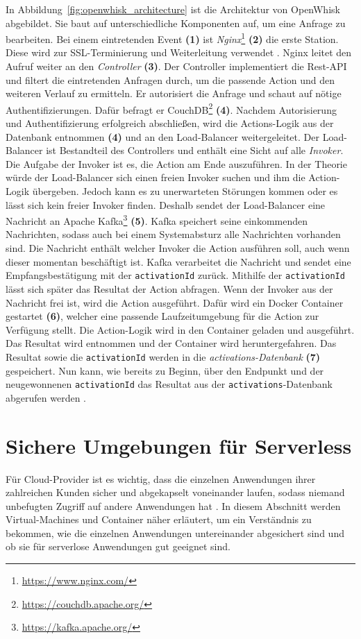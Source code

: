 In Abbildung~\ref{fig:openwhisk_architecture} ist die Architektur von
OpenWhisk abgebildet.
Sie baut auf unterschiedliche Komponenten auf,
um eine Anfrage zu bearbeiten. Bei einem eintretenden Event \textbf{(1)}
ist \emph{Nginx}\footnote{\url{https://www.nginx.com/}} \textbf{(2)} die erste
Station. Diese wird zur SSL-Terminierung und Weiterleitung verwendet \cite{OpenWhiskGithub}.
Nginx leitet den Aufruf weiter an den \emph{Controller} \textbf{(3)}.
Der Controller implementiert die Rest-API und filtert die
eintretenden Anfragen durch, um die passende Action und
den weiteren Verlauf zu ermitteln.
Er autorisiert die Anfrage und schaut auf nötige Authentifizierungen.
Dafür befragt er CouchDB\footnote{\url{https://couchdb.apache.org/}}
\textbf{(4)}. Nachdem Autorisierung
und Authentifizierung erfolgreich abschließen,
wird die Actions-Logik aus der Datenbank entnommen \textbf{(4)} und an den
Load-Balancer weitergeleitet. Der Load-Balancer ist Bestandteil
des Controllers und enthält eine Sicht auf alle \emph{Invoker}.
Die Aufgabe der Invoker ist es, die Action am Ende auszuführen.
In der Theorie würde der Load-Balancer sich einen freien Invoker suchen
und ihm die Action-Logik übergeben. Jedoch kann es zu unerwarteten
Störungen kommen oder es lässt sich kein freier
Invoker finden. Deshalb sendet der Load-Balancer eine Nachricht an
Apache Kafka\footnote{\url{https://kafka.apache.org/}} \textbf{(5)}.
Kafka speichert seine einkommenden Nachrichten, sodass auch bei einem Systemabsturz alle
Nachrichten vorhanden sind. Die Nachricht enthält welcher
Invoker die Action ausführen soll, auch wenn dieser momentan
beschäftigt ist. Kafka verarbeitet die Nachricht und sendet eine
Empfangsbestätigung mit der \texttt{activationId} zurück. Mithilfe
der \texttt{activationId} lässt sich später das Resultat der Action
abfragen. Wenn der Invoker aus der Nachricht frei ist, wird die
Action ausgeführt. Dafür wird ein Docker Container gestartet \textbf{(6)},
welcher eine passende Laufzeitumgebung für die Action zur Verfügung
stellt. Die Action-Logik wird in den Container geladen und ausgeführt.
Das Resultat wird entnommen und der Container wird heruntergefahren.
Das Resultat sowie die \texttt{activationId} werden in die
\emph{activations-Datenbank} \textbf{(7)} gespeichert. Nun kann, wie bereits zu Beginn,
über den Endpunkt und der neugewonnenen \texttt{activationId} das Resultat aus
der \texttt{activations}-Datenbank abgerufen werden
\cite{OpenWhiskGithub}.

\section{Sichere Umgebungen für Serverless}
Für Cloud-Provider ist es wichtig, dass die einzelnen
Anwendungen ihrer zahlreichen Kunden sicher und abgekapselt
voneinander laufen, sodass niemand unbefugten Zugriff auf
andere Anwendungen hat \cite{Firecracker}. In diesem Abschnitt werden
Virtual-Machines und Container näher erläutert, um ein Verständnis zu bekommen,
wie die einzelnen Anwendungen untereinander abgesichert 
sind und ob sie für serverlose Anwendungen gut geeignet sind.

